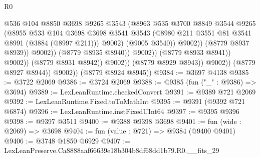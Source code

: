 \begin{lexlean}{R0}
\begin{coremodule}
                                              @536
                                              @104
                                              @8850
                                              @3698
                                              @9265
                                              @3543
                                              (@8963
                                                @535
                                                @3700
                                                @8849
                                                @3544
                                                @9265
                                                (@8955
                                                  @533
                                                  @104
                                                  @3698
                                                  @3698
                                                  @3541
                                                  @3543
                                                  (@8980
                                                    @211
                                                    @3551
                                                    @81
                                                    @3541
                                                    @8991
                                                    (@3884 (@8997 @211)))
                                                  @9002)
                                                (@9005 @3540))
                                              @9002))
                                          (@8779 @8937 @8939))
                                        @9002))
                                    (@8779 @8935 @8940))
                                  @9002))
                              (@8779 @8933 @8941))
                            @9002))
                        (@8779 @8931 @8942))
                      @9002))
                  (@8779 @8929 @8943))
                @9002))
            (@8779 @8927 @8944))
          @9002))
      (@8779 @8924 @8945))
@9384 := @3697 @4138
@9385 := @3722 @2069
@9386 := @3724 @2069
@9388 := @9385 (fun ("_" : @9386) => @3694)
@9389 := LexLeanRuntime.checkedConvert
@9391 := @9389 @721 @2069
@9392 := LexLeanRuntime.Fixed.toToMathInt
@9395 := @9391 (@9392 @721 @6874)
@9396 := LexLeanRuntime.instFixedUInt64
@9397 := @9395 @9396
@9398 := @9397 @3511
@9400 := @9388 @9398 @3698
@9401 := fun (wide : @2069) => @3698
@9404 := fun (value : @721) => @9384 (@9400 @9401)
@9406 := @3748 @1850 @6929
@9407 := LexLeanPreserve.Ca8888aaf66639e18b304b8df68dd1b79.R0.__fits_29

\end{coremodule}
\end{lexlean}
